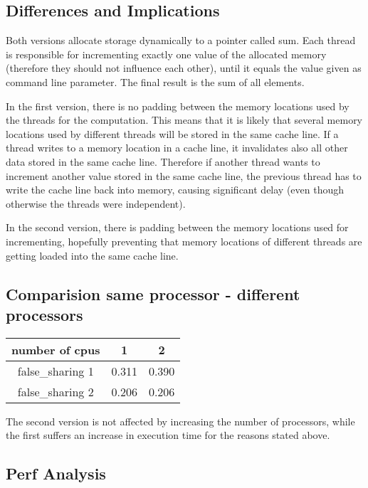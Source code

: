 \documentclass[parskip]{scrartcl}
\begin{document}
	\subsection{Differences and Implications}
	Both versions allocate storage dynamically to a pointer called sum. Each thread is responsible for incrementing exactly one value of the allocated memory (therefore they should not influence each other), until it equals the value given as command line parameter. The final result is the sum of all elements.
	
	In the first version, there is no padding between the memory locations used by the threads for the computation. This means that it is likely that several memory locations used by different threads will be stored in the same cache line. If a thread writes to a memory location in a cache line, it invalidates also all other data stored in the same cache line. Therefore if another thread wants to increment another value stored in the same cache line, the previous thread has to write the cache line back into memory, causing significant delay (even though otherwise the threads were independent).
	
	In the second version, there is padding between the memory locations used for incrementing, hopefully preventing that memory locations of different threads are getting loaded into the same cache line.
	
	\subsection{Comparision same processor - different processors}
	
	\begin{tabular}{|c|c|c|}
		\hline number of cpus & 1 & 2\\
		\hline false\_sharing 1 & 0.311 & 0.390\\
		\hline false\_sharing 2 & 0.206 & 0.206\\
		\hline
	\end{tabular}
	
	The second version is not affected by increasing the number of processors, while the first suffers an increase in execution time for the reasons stated above.
	
	\subsection{Perf Analysis}
\end{document}
